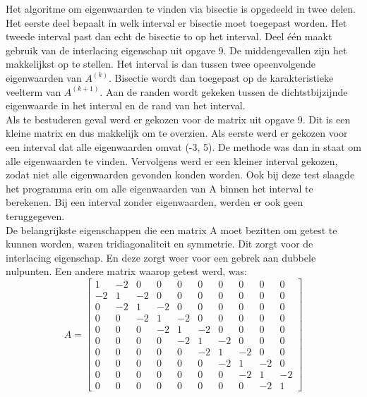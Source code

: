 Het algoritme om eigenwaarden te vinden via bisectie is opgedeeld in twee delen. Het eerste deel bepaalt in welk interval er bisectie moet toegepast worden. Het tweede interval past dan echt de bisectie to op het interval. Deel één maakt gebruik van de interlacing eigenschap uit opgave 9. De middengevallen zijn het makkelijkst op te stellen. Het interval is dan tussen twee opeenvolgende eigenwaarden van $A^{(k)}$. Bisectie wordt dan toegepast op de karakteristieke veelterm van $A^{(k+1)}$. Aan de randen wordt gekeken tussen de dichtstbijzijnde eigenwaarde in het interval en de rand van het interval.\\[12pt]

Als te bestuderen geval werd er gekozen voor de matrix uit opgave 9. Dit is een kleine matrix en dus makkelijk om te overzien. Als eerste werd er gekozen voor een interval dat alle eigenwaarden omvat (-3, 5). De methode was dan in staat om alle eigenwaarden te vinden. Vervolgens werd er een kleiner interval gekozen, zodat niet alle eigenwaarden gevonden konden worden. Ook bij deze test slaagde het programma erin om alle eigenwaarden van A binnen het interval te berekenen. Bij een interval zonder eigenwaarden, werden er ook geen teruggegeven.\\[12pt]

De belangrijkste eigenschappen die een matrix A moet bezitten om getest te kunnen worden, waren tridiagonaliteit en symmetrie. Dit zorgt voor de interlacing eigenschap. En deze zorgt weer voor een gebrek aan dubbele nulpunten. Een andere matrix waarop getest werd, was:\\[12pt]

\[
A = 
\begin{bmatrix}
1&	-2&	0	&0	&0	&0&	0	&0&	0&	0\\
-2	&1&	-2	&0&	0&	0&	0&	0&	0&	0\\
0	&-2&	1	&-2	&0	&0&	0&	0&	0&	0\\
0&	0&	-2	&1&	-2	&0&	0	&0	&0&	0\\
0&	0	&0&	-2	&1&	-2&	0&	0&	0&	0\\
0	&0&	0	&0	&-2	&1&-2&	0&	0&	0\\
0	&0&	0&	0&	0&	-2&	1	&-2	&0&	0\\
0	&0	&0&	0&	0&	0&	-2&	1&	-2&	0\\
0&	0	&0&	0&	0&	0&	0&	-2&	1	&-2\\
0&	0	&0&	0	&0	&0	&0	&0	&-2&	1
\end{bmatrix}
\]\\[12pt]

